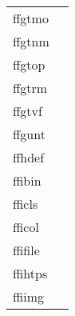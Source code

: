 \documentclass[11pt]{book}
\begin{document}
\begin{tabular}{lr}
ffgtmo  & \pageref{ffgtmo} \\
ffgtnm  & \pageref{ffgtnm} \\
ffgtop    & \pageref{ffgtop} \\
ffgtrm  & \pageref{ffgtrm} \\
ffgtvf  & \pageref{ffgtvf} \\
ffgunt     & \pageref{ffgunt} \\
ffhdef    & \pageref{ffhdef} \\
ffibin    & \pageref{ffibin} \\
fficls  & \pageref{fficls} \\
fficol   & \pageref{fficol} \\
ffifile  & \pageref{ffiurl} \\
ffihtps  & \pageref{ffihtps} \\
ffiimg     & \pageref{ffiimg} \\

\end{tabular}
\end{document}
